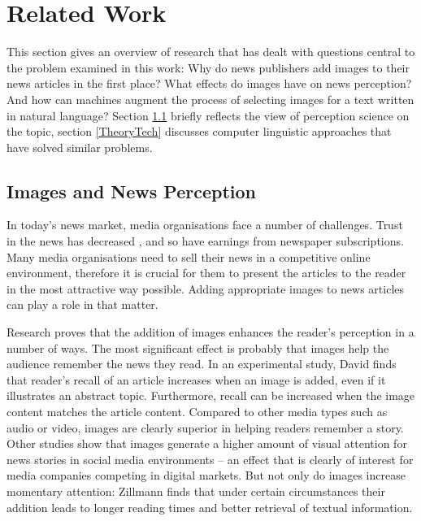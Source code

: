 \documentclass[11pt,a4paper,twoside]{article}
\begin{document}

\cleardoublepage

\section{Related Work}

This section gives an overview of research that has dealt with questions central to the problem examined in this work: Why do news publishers add images to their news articles in the first place? What effects do images have on news perception? And how can machines augment the process of selecting images for a text written in natural language? Section \ref{TheoryPerception} briefly reflects the view of perception science on the topic, section \ref{TheoryTech} discusses computer linguistic approaches that have solved similar problems.

\subsection{Images and News Perception} \label{TheoryPerception}

In today's news market, media organisations face a number of challenges. Trust in the news has decreased \cite{Newman2017Reuters2017}, and so have earnings from newspaper subscriptions. Many media organisations need to sell their news in a competitive online environment, therefore it is crucial for them to present the articles to the reader in the most attractive way possible. Adding appropriate images to news articles can play a role in that matter.

Research proves that the addition of images enhances the reader's perception in a number of ways. The most significant effect is probably that images help the audience remember the news they read. In an experimental study, David finds that reader's recall of an article increases when an image is added, even if it illustrates an abstract topic. \cite[p. 197-199]{David1998NewsNews} Furthermore, recall can be increased when the image content matches the article content. \cite[p. 187-189]{David1998NewsNews} Compared to other media types such as audio or video, images are clearly superior in helping readers remember a story. \cite{Sundar2000MultimediaDownloads} Other studies show that images generate a higher amount of visual attention for news stories in social media environments \cite{Keib2018PictureNews} -- an effect that is clearly of interest for media companies competing in digital markets. But not only do images increase momentary attention: Zillmann finds that under certain circumstances their addition leads to longer reading times and better retrieval of textual information. \cite{Zillmann2001EffectsReports}
\end{document}
